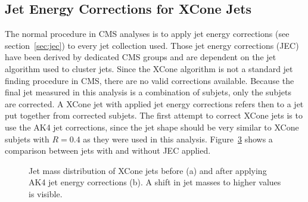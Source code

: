 \subsection{Jet Energy Corrections for XCone Jets} 
	The normal procedure in CMS analyses is to apply jet energy corrections (see section~\ref{sec:jec}) to every jet collection used. Those jet energy corrections (JEC) have been derived by dedicated CMS groups and are dependent on the jet algorithm used to cluster jets. Since the XCone algorithm is not a standard jet finding procedure in CMS, there are no valid corrections available. Because the final jet measured in this analysis is a combination of subjets, only the subjets are corrected. A XCone jet with applied jet energy corrections refers then to a jet put together from corrected subjets. The first attempt to correct XCone jets is to use the AK4 jet corrections, since the jet shape should be very similar to XCone subjets with $R=0.4$ as they were used in this analysis. Figure~\ref{fig:MJet_jec} shows a comparison between jets with and without JEC applied. 
 	\begin{figure}[tb]
 		\begin{subfigure}{.5\textwidth}
 		\centering
 		\caption{}
 		\label{fig:MJet_jec1}
 		\end{subfigure}
 		\begin{subfigure}{.5\textwidth}
 		\centering
 		\caption{}
 		\label{fig:MJet_jec2}
 		\end{subfigure}
 		\caption{Jet mass distribution of XCone jets before (a) and after applying AK4 jet energy corrections (b). A shift in jet masses to higher values is visible.}
 		\label{fig:MJet_jec}
 	\end{figure}	
